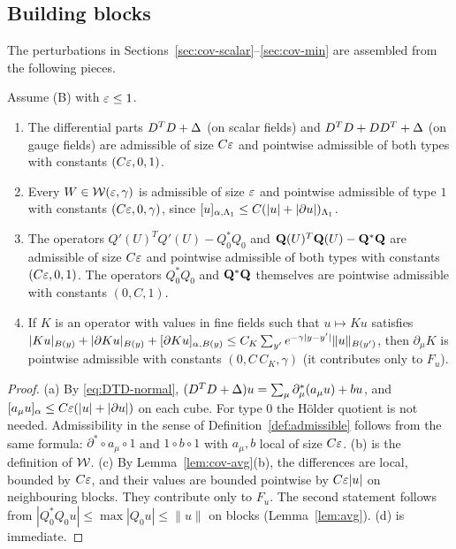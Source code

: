 \subsection{Building blocks}

The perturbations in Sections~\ref{sec:cov-scalar}--\ref{sec:cov-min} are assembled from the following pieces.

\begin{lemma}\label{lem:blocks}
Assume (B) with $\varepsilon\le1$.
\begin{enumerate}[label=(\alph*)]
\item The differential parts $D^TD+\Delta$ (on scalar fields) and $D^TD+DD^T+\Delta$ (on gauge fields) are admissible of size $C\varepsilon$ and pointwise admissible of both types with constants $(C\varepsilon,0,1)$.
\item Every $W\in\mathcal W(\varepsilon,\gamma)$ is admissible of size $\varepsilon$ and pointwise admissible of type $1$ with constants $(C\varepsilon,0,\gamma)$, since $[u]_{\alpha,\Lambda_1}\le C(|u|+|\partial u|)_{\Lambda_1}$.
\item The operators $Q'(U)^TQ'(U)-Q_0^*Q_0$ and $\mathbf Q(U)^T\mathbf Q(U)-\mathbf Q^*\mathbf Q$ are admissible of size $C\varepsilon$ and pointwise admissible of both types with constants $(C\varepsilon,0,1)$. The operators $Q_0^*Q_0$ and $\mathbf Q^*\mathbf Q$ themselves are pointwise admissible with constants $(0,C,1)$.
\item If $K$ is an operator with values in fine fields such that $u\mapsto Ku$ satisfies $|Ku|_{B(y)}+|\partial Ku|_{B(y)}+[\partial Ku]_{\alpha,B(y)}\le C_K\sum_{y'}e^{-\gamma|y-y'|}\|u\|_{B(y')}$, then $\partial_\mu K$ is pointwise admissible with constants $(0,C\,C_K,\gamma)$ (it contributes only to $F_u$).
\end{enumerate}
\end{lemma}

\begin{proof}
(a) By \eqref{eq:DTD-normal}, $(D^TD+\Delta)u=\sum_\mu\partial^*_\mu(a_\mu u)+bu$, and $[a_\mu u]_\alpha\le C\varepsilon(|u|+|\partial u|)$ on each cube. For type $0$ the H\"older quotient is not needed. Admissibility in the sense of Definition~\ref{def:admissible} follows from the same formula: $\partial^*\circ a_\mu\circ1$ and $1\circ b\circ1$ with $a_\mu,b$ local of size $C\varepsilon$. (b) is the definition of $\mathcal W$. (c) By Lemma~\ref{lem:cov-avg}(b), the differences are local, bounded by $C\varepsilon$, and their values are bounded pointwise by $C\varepsilon|u|$ on neighbouring blocks. They contribute only to $F_u$. The second statement follows from $|Q_0^*Q_0u|\le\max|Q_0u|\le\|u\|$ on blocks (Lemma~\ref{lem:avg}). (d) is immediate.
\end{proof}
